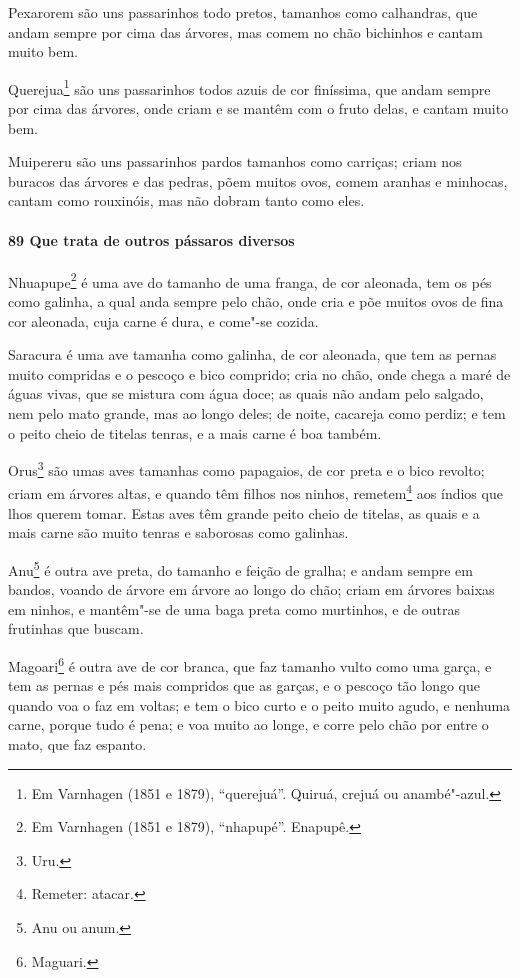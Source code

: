 Pexarorem são uns passarinhos todo pretos, tamanhos como calhandras, que andam sempre por
cima das árvores, mas comem no chão bichinhos e cantam muito bem.

Querejua\footnote{ Em Varnhagen (1851 e 1879), ``querejuá''. Quiruá, crejuá ou
anambé"-azul.} são uns passarinhos todos azuis de cor finíssima, que andam sempre por cima
das árvores, onde criam e se mantêm com o fruto delas, e cantam muito bem.

Muipereru são uns passarinhos pardos tamanhos como carriças; criam nos buracos das árvores
e das pedras, põem muitos ovos, comem aranhas e minhocas, cantam como rouxinóis, mas não
dobram tanto como eles.

\paragraph{89 Que trata de outros pássaros diversos}

Nhuapupe\footnote{ Em Varnhagen (1851 e 1879), ``nhapupé''. Enapupê.} é uma ave do tamanho
de uma franga, de cor aleonada, tem os pés como galinha, a qual anda sempre pelo chão,
onde cria e põe muitos ovos de fina cor aleonada, cuja carne é dura, e come"-se cozida.

Saracura é uma ave tamanha como galinha, de cor aleonada, que tem as pernas muito
compridas e o pescoço e bico comprido; cria no chão, onde chega a maré de águas vivas, que
se mistura com água doce; as quais não andam pelo salgado, nem pelo mato grande, mas ao
longo deles; de noite, cacareja como perdiz; e tem o peito cheio de titelas tenras, e a
mais carne é boa também.

Orus\footnote{ Uru.} são umas aves tamanhas como papagaios, de cor preta e o bico revolto;
criam em árvores altas, e quando têm filhos nos ninhos, remetem\footnote{ Remeter:
atacar.} aos índios que lhos querem tomar. Estas aves têm grande peito cheio de
titelas, as quais e a mais carne são muito tenras e saborosas como galinhas.

Anu\footnote{ Anu ou anum.} é outra ave preta, do tamanho e feição de gralha; e andam
sempre em bandos, voando de árvore em árvore ao longo do chão; criam em árvores baixas em
ninhos, e mantêm"-se de uma baga preta como murtinhos, e de outras frutinhas que buscam.

Magoari\footnote{ Maguari.} é outra ave de cor branca, que faz tamanho vulto como uma
garça, e tem as pernas e pés mais compridos que as garças, e o pescoço tão longo que
quando voa o faz em voltas; e tem o bico curto e o peito muito agudo, e nenhuma carne,
porque tudo é pena; e voa muito ao longe, e corre pelo chão por entre o mato, que faz
espanto.

